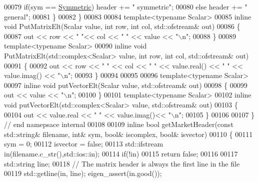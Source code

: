 \begin{DoxyCode}
{00079       \textcolor{keywordflow}{if}(sym == \hyperlink{group__enums_gga39e3366ff5554d731e7dc8bb642f83cda7d30fb969ef6b763c098f0015108cef4}{Symmetric}) header += \textcolor{stringliteral}{" symmetric"};
00080       \textcolor{keywordflow}{else} header += \textcolor{stringliteral}{" general"};
00081     \}
00082   \}
00083 
00084   \textcolor{keyword}{template}<\textcolor{keyword}{typename} Scalar>
00085   \textcolor{keyword}{inline} \textcolor{keywordtype}{void} PutMatrixElt(Scalar value, \textcolor{keywordtype}{int} row, \textcolor{keywordtype}{int} col, std::ofstream& out)
00086   \{
00087     out << row << \textcolor{stringliteral}{" "}<< col << \textcolor{stringliteral}{" "} << value << \textcolor{stringliteral}{"\(\backslash\)n"};
00088   \}
00089   \textcolor{keyword}{template}<\textcolor{keyword}{typename} Scalar>
00090   \textcolor{keyword}{inline} \textcolor{keywordtype}{void} PutMatrixElt(std::complex<Scalar> value, \textcolor{keywordtype}{int} row, \textcolor{keywordtype}{int} col, std::ofstream& out)
00091   \{
00092     out << row << \textcolor{stringliteral}{" "} << col << \textcolor{stringliteral}{" "} << value.real() << \textcolor{stringliteral}{" "} << value.imag() << \textcolor{stringliteral}{"\(\backslash\)n"};
00093   \}
00094 
00095 
00096   \textcolor{keyword}{template}<\textcolor{keyword}{typename} Scalar>
00097   \textcolor{keyword}{inline} \textcolor{keywordtype}{void} putVectorElt(Scalar value, std::ofstream& out)
00098   \{
00099     out << value << \textcolor{stringliteral}{"\(\backslash\)n"}; 
00100   \}
00101   \textcolor{keyword}{template}<\textcolor{keyword}{typename} Scalar>
00102   \textcolor{keyword}{inline} \textcolor{keywordtype}{void} putVectorElt(std::complex<Scalar> value, std::ofstream& out)
00103   \{
00104     out << value.real << \textcolor{stringliteral}{" "} << value.imag()<< \textcolor{stringliteral}{"\(\backslash\)n"}; 
00105   \}
00106 
00107 \} \textcolor{comment}{// end namepsace internal}
00108 
00109 \textcolor{keyword}{inline} \textcolor{keywordtype}{bool} getMarketHeader(\textcolor{keyword}{const} std::string& filename, \textcolor{keywordtype}{int}& sym, \textcolor{keywordtype}{bool}& iscomplex, \textcolor{keywordtype}{bool}& isvector)
00110 \{
00111   sym = 0; 
00112   isvector = \textcolor{keyword}{false};
00113   std::ifstream in(filename.c\_str(),std::ios::in);
00114   \textcolor{keywordflow}{if}(!in)
00115     \textcolor{keywordflow}{return} \textcolor{keyword}{false};
00116   
00117   std::string line; 
00118   \textcolor{comment}{// The matrix header is always the first line in the file }
00119   std::getline(in, line); eigen\_assert(in.good());
}
\end{DoxyCode}
